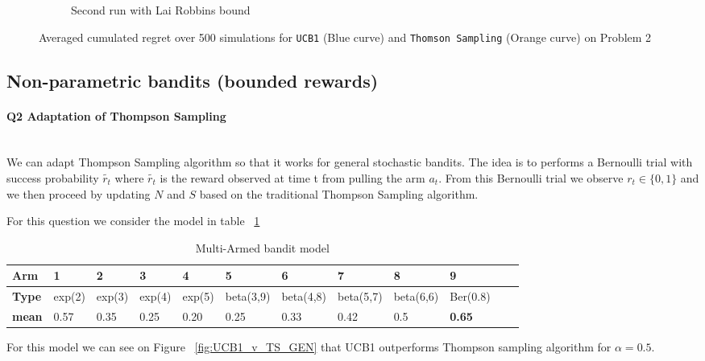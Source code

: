 \documentclass[11pt]{article}
\numberwithin{figure}{section} %
\begin{document}
\begin{figure}[H]
\begin{subfigure}{.5\textwidth}
        \caption{Second run with Lai Robbins bound}
        \label{fig:hard_lr}
    \end{subfigure}
		\caption{Averaged cumulated regret over 500 simulations for \texttt{UCB1} (Blue curve) and \texttt{Thomson Sampling} (Orange curve) on Problem 2}
\label{fig:hard_ucb_v_ts}
\end{figure}

\subsection{Non-parametric bandits (bounded rewards)}
\paragraph{Q2 Adaptation of Thompson Sampling}\mbox{}\\

We can adapt Thompson Sampling algorithm so that it works for general stochastic bandits. The idea is to performs a Bernoulli trial with success probability $\widetilde{r_t}$ where $\widetilde{r_t}$ is the reward observed at time t from pulling the arm $a_t$. From this Bernoulli trial we observe $r_t \in \{0, 1\}$ and we then proceed by updating $N$ and $S$ based on the traditional Thompson Sampling algorithm.

For this question we consider the model in table ~\ref{table:mab_model}
\begin{table}[H]
\centering
\small
\begin{tabular}{|l|l|l|l|l|l|l|l|l|l|l|l|}
\hline
\textbf{Arm} & 1 & 2 & 3 & 4 & 5 & 6 & 7 & 8 & 9 \\ \hline
\textbf{Type} & exp(2) & exp(3) & exp(4) & exp(5) & beta(3,9) & beta(4,8) & beta(5,7) & beta(6,6) & Ber(0.8) \\ \hline
\textbf{mean} & 0.57 & 0.35 & 0.25 & 0.20 & 0.25 & 0.33 & 0.42 & 0.5 & \textbf{0.65} \\ \hline
\end{tabular}
\caption{Multi-Armed bandit model}
\label{table:mab_model}
\end{table}

For this model we can see on Figure ~\ref{fig:UCB1_v_TS_GEN} that UCB1 outperforms Thompson sampling algorithm for $\alpha = 0.5$.
\end{document}
